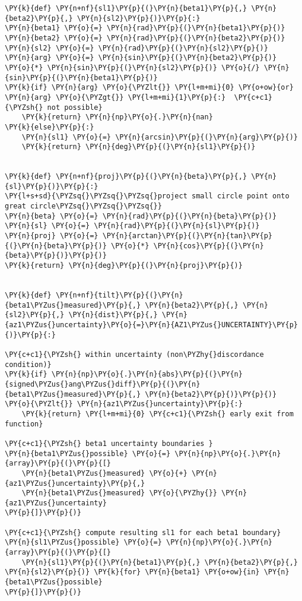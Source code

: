 \begin{tcolorbox}[breakable, size=fbox, boxrule=1pt, pad at break*=1mm,colback=cellbackground, colframe=cellborder]
\begin{Verbatim}[commandchars=\\\{\}]
\PY{k}{def} \PY{n+nf}{sl1}\PY{p}{(}\PY{n}{beta1}\PY{p}{,} \PY{n}{beta2}\PY{p}{,} \PY{n}{sl2}\PY{p}{)}\PY{p}{:}
\PY{n}{beta1} \PY{o}{=} \PY{n}{rad}\PY{p}{(}\PY{n}{beta1}\PY{p}{)}
\PY{n}{beta2} \PY{o}{=} \PY{n}{rad}\PY{p}{(}\PY{n}{beta2}\PY{p}{)}
\PY{n}{sl2} \PY{o}{=} \PY{n}{rad}\PY{p}{(}\PY{n}{sl2}\PY{p}{)}
\PY{n}{arg} \PY{o}{=} \PY{n}{sin}\PY{p}{(}\PY{n}{beta2}\PY{p}{)} \PY{o}{*} \PY{n}{sin}\PY{p}{(}\PY{n}{sl2}\PY{p}{)} \PY{o}{/} \PY{n}{sin}\PY{p}{(}\PY{n}{beta1}\PY{p}{)}
\PY{k}{if} \PY{n}{arg} \PY{o}{\PYZlt{}} \PY{l+m+mi}{0} \PY{o+ow}{or} \PY{n}{arg} \PY{o}{\PYZgt{}} \PY{l+m+mi}{1}\PY{p}{:}  \PY{c+c1}{\PYZsh{} not possible}
    \PY{k}{return} \PY{n}{np}\PY{o}{.}\PY{n}{nan}
\PY{k}{else}\PY{p}{:}
    \PY{n}{sl1} \PY{o}{=} \PY{n}{arcsin}\PY{p}{(}\PY{n}{arg}\PY{p}{)}
    \PY{k}{return} \PY{n}{deg}\PY{p}{(}\PY{n}{sl1}\PY{p}{)}


\PY{k}{def} \PY{n+nf}{proj}\PY{p}{(}\PY{n}{beta}\PY{p}{,} \PY{n}{sl}\PY{p}{)}\PY{p}{:}
\PY{l+s+sd}{\PYZsq{}\PYZsq{}\PYZsq{}project small circle point onto great circle\PYZsq{}\PYZsq{}\PYZsq{}}
\PY{n}{beta} \PY{o}{=} \PY{n}{rad}\PY{p}{(}\PY{n}{beta}\PY{p}{)}
\PY{n}{sl} \PY{o}{=} \PY{n}{rad}\PY{p}{(}\PY{n}{sl}\PY{p}{)}
\PY{n}{proj} \PY{o}{=} \PY{n}{arctan}\PY{p}{(}\PY{n}{tan}\PY{p}{(}\PY{n}{beta}\PY{p}{)} \PY{o}{*} \PY{n}{cos}\PY{p}{(}\PY{n}{beta}\PY{p}{)}\PY{p}{)}
\PY{k}{return} \PY{n}{deg}\PY{p}{(}\PY{n}{proj}\PY{p}{)}


\PY{k}{def} \PY{n+nf}{tilt}\PY{p}{(}\PY{n}{beta1\PYZus{}measured}\PY{p}{,} \PY{n}{beta2}\PY{p}{,} \PY{n}{sl2}\PY{p}{,} \PY{n}{dist}\PY{p}{,} \PY{n}{az1\PYZus{}uncertainty}\PY{o}{=}\PY{n}{AZ1\PYZus{}UNCERTAINTY}\PY{p}{)}\PY{p}{:}

\PY{c+c1}{\PYZsh{} within uncertainty (non\PYZhy{}discordance condition)}
\PY{k}{if} \PY{n}{np}\PY{o}{.}\PY{n}{abs}\PY{p}{(}\PY{n}{signed\PYZus{}ang\PYZus{}diff}\PY{p}{(}\PY{n}{beta1\PYZus{}measured}\PY{p}{,} \PY{n}{beta2}\PY{p}{)}\PY{p}{)} \PY{o}{\PYZlt{}} \PY{n}{az1\PYZus{}uncertainty}\PY{p}{:}
    \PY{k}{return} \PY{l+m+mi}{0} \PY{c+c1}{\PYZsh{} early exit from function}

\PY{c+c1}{\PYZsh{} beta1 uncertainty boundaries }
\PY{n}{beta1\PYZus{}possible} \PY{o}{=} \PY{n}{np}\PY{o}{.}\PY{n}{array}\PY{p}{(}\PY{p}{[}
    \PY{n}{beta1\PYZus{}measured} \PY{o}{+} \PY{n}{az1\PYZus{}uncertainty}\PY{p}{,}
    \PY{n}{beta1\PYZus{}measured} \PY{o}{\PYZhy{}} \PY{n}{az1\PYZus{}uncertainty}
\PY{p}{]}\PY{p}{)}

\PY{c+c1}{\PYZsh{} compute resulting sl1 for each beta1 boundary}
\PY{n}{sl1\PYZus{}possible} \PY{o}{=} \PY{n}{np}\PY{o}{.}\PY{n}{array}\PY{p}{(}\PY{p}{[}
    \PY{n}{sl1}\PY{p}{(}\PY{n}{beta1}\PY{p}{,} \PY{n}{beta2}\PY{p}{,} \PY{n}{sl2}\PY{p}{)} \PY{k}{for} \PY{n}{beta1} \PY{o+ow}{in} \PY{n}{beta1\PYZus{}possible}
\PY{p}{]}\PY{p}{)}


\end{Verbatim}
\end{tcolorbox}
